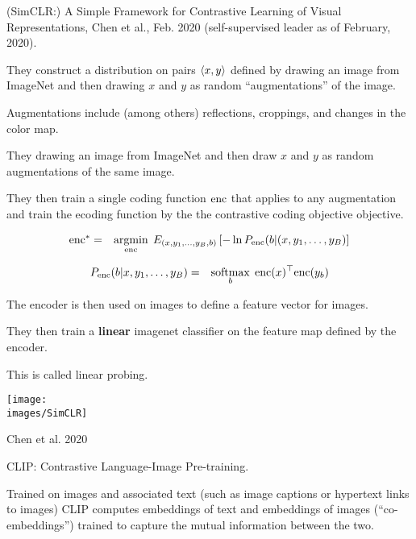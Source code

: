{

(SimCLR:) A Simple Framework for Contrastive Learning of Visual Representations, Chen et al., Feb. 2020 (self-supervised leader as of February, 2020).

\vfill
They construct a distribution on pairs ${\mbox{$\langle x,y\rangle$}}$ defined by drawing an image from ImageNet and then drawing $x$ and $y$ as random ``augmentations'' of the image.

\vfill
Augmentations include (among others) reflections, croppings, and changes in the color map.


\vfill
They drawing an image from ImageNet and then draw $x$ and $y$ as random augmentations
of the same image.

\vfill
They then train a single coding function $\mathrm{enc}$ that applies to any augmentation and train the ecoding function by the
the contrastive coding objective objective.

\begin{eqnarray*}
\mathrm{enc}^* & = & \operatorname*{argmin}_{\mathrm{enc}} \;E_{(x,y_1,\ldots,y_B,b)}\left[-\ln P_{\mathrm{enc}}(b|(x,y_1,\ldots,y_B)\right]
\end{eqnarray*}

\begin{eqnarray*}
P_{\mathrm{enc}}(b|x,y_1,\ldots,y_B) & = & \operatorname*{softmax}_b\; \mathrm{enc}(x)^\top \mathrm{enc}(y_b)
\end{eqnarray*}



The encoder is then used on images to define a feature vector for images.

\vfill
They then train a {\bf linear} imagenet classifier on the feature map defined by the encoder.

\vfill
This is called linear probing.


\centerline{\texttt{[image: \\images/SimCLR]}}

\vfill
\centerline{\huge Chen et al. 2020}


CLIP: Contrastive Language-Image Pre-training.

\vfill
Trained on images and associated text (such as image captions or hypertext links to images) CLIP computes embeddings of text and embeddings of images
(``co-embeddings'') trained to capture the mutual information between the two.

}
